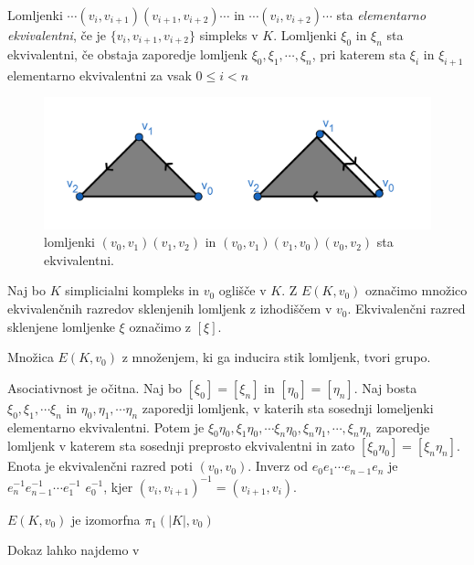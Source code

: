 \documentclass[mat1]{fmfdelo}
\begin{document}
Lomljenki $\cdots(v_i,v_{i+1})(v_{i+1},v_{i+2})\cdots$ in $\cdots(v_i,v_{i+2})\cdots$ sta \textit{elementarno ekvivalentni}, če je $\{v_i,v_{i+1},v_{i+2}\}$ simpleks v $K$. Lomljenki $\xi_0$ in $\xi_n$ sta ekvivalentni, če obstaja zaporedje lomljenk $\xi_0,\xi_1,\cdots,\xi_n$, pri katerem sta $\xi_i$ in $\xi_{i+1}$ elementarno ekvivalentni za vsak $0\leq i < n$


\begin{figure}[h]
    \centering
    \includegraphics[width=0.9\linewidth]{lomljenki2.png}
    \caption{lomljenki $(v_0,v_1)(v_1,v_2)$ in $(v_0,v_1)(v_1,v_0)(v_0,v_2)$ sta ekvivalentni.}
\end{figure}

    Naj bo $K$ simplicialni kompleks in $v_0$ oglišče v $K$. Z $E(K,v_0)$ označimo množico ekvivalenčnih razredov sklenjenih lomljenk z izhodiščem v $v_0$. Ekvivalenčni razred sklenjene lomljenke $\xi$ označimo z $[\xi]$.

    \begin{trditev}
        Množica $E(K,v_0)$ z množenjem, ki ga inducira stik lomljenk, tvori grupo.
    \end{trditev}
\begin{dokaz}
    Asociativnost je očitna. Naj bo $[\xi_0]=[\xi_n]$ in $[\eta_0]=[\eta_n]$. Naj bosta $\xi_0,\xi_1,\cdots \xi_n$ in $\eta_0,\eta_1,\cdots \eta_n$ zaporedji lomljenk, v katerih sta sosednji lomeljenki elementarno ekvivalentni. Potem je $\xi_0\eta_0,\xi_1\eta_0,\cdots \xi_n\eta_0,\xi_n\eta_1,\cdots, \xi_n\eta_n$ zaporedje lomljenk v katerem sta sosednji preprosto ekvivalentni in zato $[\xi_0\eta_0]=[\xi_n\eta_n]$.
        Enota je ekvivalenčni razred poti $(v_0,v_0)$. Inverz 
    od $e_0e_1 \cdots e_{n-1}e_n$ je $e^{-1}_n e^{-1}_{n-1} \cdots e^{-1}_1$ $e^{-1}_0$, kjer $(v_i,v_{i+1})^{-1}=(v_{i+1},v_i)$.
\end{dokaz}

\begin{izrek}
    $E(K,v_0)$ je izomorfna $\pi_1(|K|,v_0)$
    \label{iz:grupa lomljenk}
\end{izrek}

Dokaz lahko najdemo v \cite[razdelek 3.6]{spanier}
\end{document}

